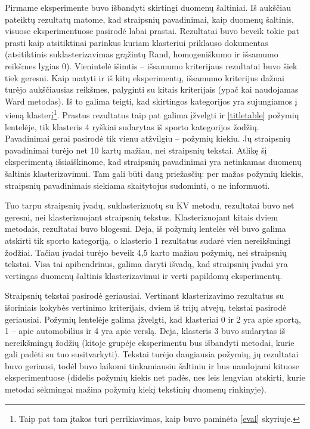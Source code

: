 \documentclass{VUMIFInfBakalaurinis}
\begin{document}
Pirmame eksperimente buvo išbandyti skirtingi duomenų šaltiniai. Iš
aukščiau pateiktų rezultatų matome, kad straipsnių pavadinimai, kaip
duomenų šaltinis, visuose eksperimentuose pasirodė labai prastai.
Rezultatai buvo beveik tokie pat prasti kaip atsitiktinai parinkus
kuriam klasteriui priklauso dokumentas (atsitiktinis suklasterizavimas
grąžintų Rand, homogeniškumo ir išsamumo reikšmes lygias 0). Vienintelė
išimtis -- išsamumo kriterijaus rezultatai buvo šiek tiek geresni. Kaip
matyti ir iš kitų eksperimentų, išsamumo kriterijus dažnai turėjo
aukščiausias reikšmes, palyginti su kitais kriterijais (ypač kai
naudojamas Ward metodas). Iš to galima teigti, kad skirtingos
kategorijos yra sujungiamos į vieną klasterį\footnote{Taip pat tam
  įtakos turi perrikiavimas, kaip buvo paminėta \ref{eval} skyriuje.}.
Prastus rezultatus taip pat galima įžvelgti ir \ref{titletable} požymių lentelėje, tik klasteris 4 ryškiai sudarytas iš sporto kategorijos
žodžių. Pavadinimai gerai pasirodė tik vienu atžvilgiu -- požymių
kiekiu. Jų straipsnių pavadinimai turėjo net 10 kartų mažiau, nei
straipsnių tekstai. Atlikę šį eksperimentą išsiaiškinome, kad straipsnių
pavadinimai yra netinkamas duomenų šaltinis klasterizavimui. Tam gali
būti daug priežasčių: per mažas požymių kiekis, straipsnių pavadinimais
siekiama skaitytojus sudominti, o ne informuoti.

Tuo tarpu straipsnių įvadų, suklasterizuotų su KV metodu, rezultatai
buvo net geresni, nei klasterizuojant straipsnių tekstus.
Klasterizuojant kitais dviem metodais, rezultatai buvo blogesni. Deja,
iš požymių lentelės vėl buvo galima atskirti tik sporto kategoriją, o
klasterio 1 rezultatus sudarė vien nereikšmingi žodžiai. Tačiau
įvadai turėjo beveik 4,5 karto mažiau požymių, nei straipsnių tekstai.
Visa tai apibendrinus, galima daryti išvadą, kad straipsnių įvadai yra
vertingas duomenų šaltinis klasterizavimui ir verti papildomų
eksperimentų.

Straipsnių tekstai pasirodė geriausiai. Vertinant klasterizavimo
rezultatus su išoriniais kokybės vertinimo kriterijais, dviem iš trijų atvejų, tekstai
pasirodė geriausiai. Požymių lentelėje galima įžvelgti, kad klasteriai
 0 ir 2 yra apie sportą, 1 -- apie automobilius ir 4 yra apie
verslą. Deja, klasteris 3 buvo sudarytas iš nereikšmingų žodžių
(kitoje grupėje eksperimentu bus išbandyti metodai, kurie gali padėti su
tuo susitvarkyti). Tekstai turėjo daugiausia požymių, jų rezultatai buvo
geriausi, todėl buvo laikomi tinkamiausiu šaltiniu ir bus naudojami
kituose eksperimentuose (didelis požymių kiekis net padės, nes leis
lengviau atskirti, kurie metodai sėkmingai mažina požymių kiekį
tekstinių duomenų rinkinyje).
\end{document}
